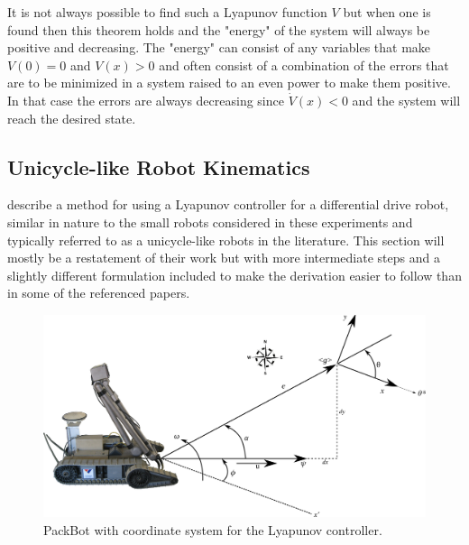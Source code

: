 It is not always possible to find such a Lyapunov function $V$ but when one is found then this theorem holds and the "energy" of the system will always be positive and decreasing. The "energy" can consist of any variables that make $V(0) = 0$ and $V(x) > 0$ and often consist of a combination of the errors that are to be minimized in a system raised to an even power to make them positive. In that case the errors are always decreasing since $\dot{V}(x) < 0$ and the system will reach the desired state.

\subsection{Unicycle-like Robot Kinematics}
\label{sec:unicycleKinematics}
\cite{Rusu05RobotuxLyapunov,Aicardi_UnicycleLyapunov95} describe a method for using a Lyapunov controller for a differential drive robot, similar in nature to the small robots considered in these experiments and typically referred to as a unicycle-like robots in the literature. This section will mostly be a restatement of their work but with more intermediate steps and a slightly different formulation included to make the derivation easier to follow than in some of the referenced papers.

\begin{figure}[ht!]
	\centering
	\includegraphics[width=.95\textwidth]{images/packbotlyapunov}
	\caption{PackBot with coordinate system for the Lyapunov controller.}
	\label{fig:pblyapunov}
\end{figure}

